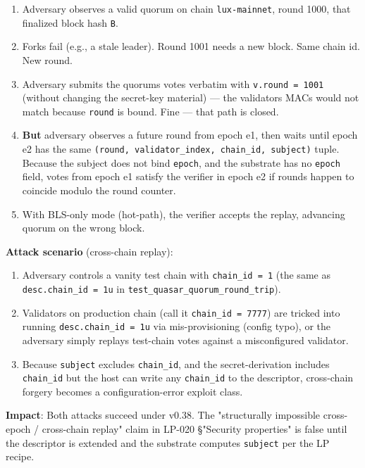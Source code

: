 \documentclass[
]{article}
\providecommand{\tightlist}{%
  \setlength{\itemsep}{0pt}\setlength{\parskip}{0pt}}
\begin{document}
\begin{enumerate}
\def\labelenumi{\arabic{enumi}.}
\tightlist
\item
  Adversary observes a valid quorum on chain \texttt{lux-mainnet}, round
  1000, that finalized block hash \texttt{B}.
\item
  Forks fail (e.g., a stale leader). Round 1001 needs a new block. Same
  chain id. New round.
\item
  Adversary submits the quorum\textquotesingle s votes verbatim with
  \texttt{v.round\ =\ 1001} (without changing the secret-key material)
  --- the validators\textquotesingle{} MACs would not match because
  \texttt{round} is bound. Fine --- that path is closed.
\item
  \textbf{But} adversary observes a future round from epoch e1, then
  waits until epoch e2 has the same
  \texttt{(round,\ validator\_index,\ chain\_id,\ subject)} tuple.
  Because the subject does not bind \texttt{epoch}, and the substrate
  has no \texttt{epoch} field, votes from epoch e1 satisfy the verifier
  in epoch e2 if rounds happen to coincide modulo the round counter.
\item
  With BLS-only mode (hot-path), the verifier accepts the replay,
  advancing quorum on the wrong block.
\end{enumerate}

\textbf{Attack scenario} (cross-chain replay):

\begin{enumerate}
\def\labelenumi{\arabic{enumi}.}
\tightlist
\item
  Adversary controls a vanity test chain with \texttt{chain\_id\ =\ 1}
  (the same as \texttt{desc.chain\_id\ =\ 1u} in
  \texttt{test\_quasar\_quorum\_round\_trip}).
\item
  Validators on production chain (call it \texttt{chain\_id\ =\ 7777})
  are tricked into running \texttt{desc.chain\_id\ =\ 1u} via
  mis-provisioning (config typo), or the adversary simply replays
  test-chain votes against a misconfigured validator.
\item
  Because \texttt{subject} excludes \texttt{chain\_id}, and the
  secret-derivation includes \texttt{chain\_id} but the host can write
  any \texttt{chain\_id} to the descriptor, cross-chain forgery becomes
  a configuration-error exploit class.
\end{enumerate}

\textbf{Impact}: Both attacks succeed under v0.38. The "structurally
impossible cross-epoch / cross-chain replay" claim in LP-020 §"Security
properties" is false until the descriptor is extended and the substrate
computes \texttt{subject} per the LP recipe.
\end{document}
